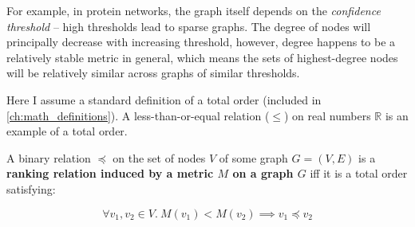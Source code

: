 For example, in protein networks, the graph itself depends on the \textsl{confidence threshold} -- high thresholds lead to sparse graphs.
The degree of nodes will principally decrease with increasing threshold, however, degree happens to be a relatively stable metric in general, which means the sets of highest-degree nodes will be relatively similar across graphs of similar thresholds.

%

Here I assume a standard definition of a total order (included in \cref{ch:math_definitions}).
A less-than-or-equal relation ($\leq$) on real numbers $\mathbb{R}$ is an example of a total order.

\begin{definition}
    \label{def:ranking_relation}
    A binary relation $\preceq$ on the set of nodes $V$ of some graph $G = (V, E)$ is a \textbf{ranking relation induced by a metric $M$ on a graph $G$} iff it is a total order satisfying:

    \[ \forall v_1, v_2 \in V.\ M(v_1) < M(v_2) \implies v_1 \preceq v_2 \]
\end{definition}

